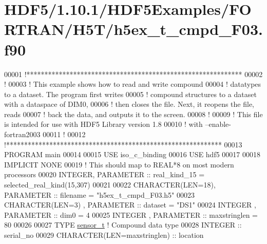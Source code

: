 \hypertarget{_h_d_f5_21_810_81_2_h_d_f5_examples_2_f_o_r_t_r_a_n_2_h5_t_2h5ex__t__cmpd___f03_8f90_source}{}\section{H\+D\+F5/1.10.1/\+H\+D\+F5\+Examples/\+F\+O\+R\+T\+R\+A\+N/\+H5\+T/h5ex\+\_\+t\+\_\+cmpd\+\_\+\+F03.f90}
\label{_h_d_f5_21_810_81_2_h_d_f5_examples_2_f_o_r_t_r_a_n_2_h5_t_2h5ex__t__cmpd___f03_8f90_source}

\begin{DoxyCode}
00001 \textcolor{comment}{!************************************************************}
00002 \textcolor{comment}{!}
00003 \textcolor{comment}{!  This example shows how to read and write compound}
00004 \textcolor{comment}{!  datatypes to a dataset.  The program first writes}
00005 \textcolor{comment}{!  compound structures to a dataset with a dataspace of DIM0,}
00006 \textcolor{comment}{!  then closes the file.  Next, it reopens the file, reads}
00007 \textcolor{comment}{!  back the data, and outputs it to the screen.}
00008 \textcolor{comment}{!}
00009 \textcolor{comment}{!  This file is intended for use with HDF5 Library version 1.8}
00010 \textcolor{comment}{!  with --enable-fortran2003}
00011 \textcolor{comment}{!}
00012 \textcolor{comment}{!************************************************************}
00013 \textcolor{keyword}{PROGRAM} main
00014 
00015   \textcolor{keywordtype}{USE }iso\_c\_binding
00016   \textcolor{keywordtype}{USE }hdf5
00017 
00018   \textcolor{keywordtype}{IMPLICIT NONE}
00019   \textcolor{comment}{! This should map to REAL*8 on most modern processors}
00020   \textcolor{keywordtype}{INTEGER}, \textcolor{keywordtype}{PARAMETER} :: real\_kind\_15 = selected\_real\_kind(15,307)
00021 
00022   \textcolor{keywordtype}{CHARACTER(LEN=18)}, \textcolor{keywordtype}{PARAMETER} :: filename     = \textcolor{stringliteral}{"h5ex\_t\_cmpd\_F03.h5"}
00023   \textcolor{keywordtype}{CHARACTER(LEN=3)} , \textcolor{keywordtype}{PARAMETER} :: dataset      = \textcolor{stringliteral}{"DS1"}
00024   \textcolor{keywordtype}{INTEGER}          , \textcolor{keywordtype}{PARAMETER} :: dim0         = 4
00025   \textcolor{keywordtype}{INTEGER}          , \textcolor{keywordtype}{PARAMETER} :: maxstringlen = 80
00026 
00027   \textcolor{keyword}{TYPE} \hyperlink{structsensor__t}{sensor\_t} \textcolor{comment}{! Compound data type}
00028      \textcolor{keywordtype}{INTEGER} :: serial\_no
00029      \textcolor{keywordtype}{CHARACTER(LEN=maxstringlen)} :: location

\end{DoxyCode}
